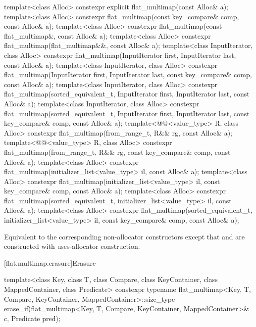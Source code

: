 %
\begin{itemdecl}
template<class Alloc>
  constexpr explicit flat_multimap(const Alloc& a);
template<class Alloc>
  constexpr flat_multimap(const key_compare& comp, const Alloc& a);
template<class Alloc>
  constexpr flat_multimap(const flat_multimap&, const Alloc& a);
template<class Alloc>
  constexpr flat_multimap(flat_multimap&&, const Alloc& a);
template<class InputIterator, class Alloc>
  constexpr flat_multimap(InputIterator first, InputIterator last, const Alloc& a);
template<class InputIterator, class Alloc>
  constexpr flat_multimap(InputIterator first, InputIterator last, const key_compare& comp,
                          const Alloc& a);
template<class InputIterator, class Alloc>
  constexpr flat_multimap(sorted_equivalent_t, InputIterator first, InputIterator last,
                          const Alloc& a);
template<class InputIterator, class Alloc>
  constexpr flat_multimap(sorted_equivalent_t, InputIterator first, InputIterator last,
                          const key_compare& comp, const Alloc& a);
template<@@<value_type> R, class Alloc>
  constexpr flat_multimap(from_range_t, R&& rg, const Alloc& a);
template<@@<value_type> R, class Alloc>
  constexpr flat_multimap(from_range_t, R&& rg, const key_compare& comp, const Alloc& a);
template<class Alloc>
  constexpr flat_multimap(initializer_list<value_type> il, const Alloc& a);
template<class Alloc>
  constexpr flat_multimap(initializer_list<value_type> il, const key_compare& comp,
                          const Alloc& a);
template<class Alloc>
  constexpr flat_multimap(sorted_equivalent_t, initializer_list<value_type> il, const Alloc& a);
template<class Alloc>
  constexpr flat_multimap(sorted_equivalent_t, initializer_list<value_type> il,
                          const key_compare& comp, const Alloc& a);
\end{itemdecl}

\begin{itemdescr}
\pnum
\effects
Equivalent to the corresponding non-allocator constructors
except that  and  are constructed
with uses-allocator construction.
\end{itemdescr}

[flat.multimap.erasure]{Erasure}

%
\begin{itemdecl}
template<class Key, class T, class Compare, class KeyContainer, class MappedContainer,
         class Predicate>
  constexpr typename flat_multimap<Key, T, Compare, KeyContainer, MappedContainer>::size_type
    erase_if(flat_multimap<Key, T, Compare, KeyContainer, MappedContainer>& c, Predicate pred);
\end{itemdecl}


